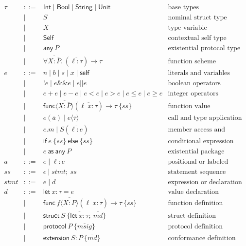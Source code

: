 \documentclass[manuscript,nonacm]{acmart}
\newcommand{\kw}[1]{\ensuremath{\mathsf{#1}}}
\newcommand{\Int}{\kw{Int}}
\newcommand{\Bool}{\kw{Bool}}
\newcommand{\String}{\kw{String}}
\newcommand{\Unit}{\kw{Unit}}
\newcommand{\Self}{\kw{Self}\xspace}
\newcommand{\Any}[1]{\kw{any}\ #1}
\newcommand{\ftype}[3]{\forall #1.\ (#2) \to #3}
\begin{document}
\[
\begin{array}{rcll}
\tau & ::= & \Int \mid \Bool \mid \String \mid \Unit
  & \text{base types} \\
& \mid & S
  & \text{nominal struct type} \\
& \mid & X
  & \text{type variable} \\
& \mid & \Self
  & \text{contextual self type} \\
& \mid & \Any{P}
  & \text{existential protocol type} \\
& \mid & \ftype{\overline{X : \overline{P}}}{\overline{\ell : \tau}}{\tau}
  & \text{function scheme} \\[1mm]

e & ::= & n \mid b \mid s \mid x \mid \kw{self}
  & \text{literals and variables} \\
& \mid & {!}e \mid e\mathbin{\&\&}e \mid e\mathbin{||}e
  & \text{boolean operators} \\
& \mid & e+e \mid e-e \mid e<e \mid e>e \mid e\leq e \mid e\geq e
  & \text{integer operators} \\
& \mid & \kw{func}\langle\overline{X : \overline{P}}\rangle
          (\overline{\ell\ x : \tau}) \to \tau\ \{ ss \}
  & \text{function value} \\
& \mid & e(\overline{a}) \mid e\langle\overline{\tau}\rangle
  & \text{call and type application} \\
& \mid & e.m \mid S(\overline{\ell : e})
  & \text{member access and construction} \\
& \mid & \kw{if}\ e\ \{ ss \}\ \kw{else}\ \{ ss \}
  & \text{conditional expression} \\
& \mid & e\ \kw{as}\ \Any{P}
  & \text{existential package} \\[1mm]

a & ::= & e \mid \ell : e
  & \text{positional or labeled argument} \\[1mm]

ss & ::= & \epsilon \mid stmt;\ ss
  & \text{statement sequence} \\
stmt & ::= & e \mid d
  & \text{expression or declaration} \\[1mm]

d & ::= & \kw{let}\ x : \tau = e
  & \text{value declaration} \\
& \mid & \kw{func}\ f\langle\overline{X : \overline{P}}\rangle
          (\overline{\ell\ x : \tau}) \to \tau\ \{ ss \}
  & \text{function definition} \\
& \mid & \kw{struct}\ S\ \{ \overline{\kw{let}\ x : \tau};\ \overline{md} \}
  & \text{struct definition} \\
& \mid & \kw{protocol}\ P\ \{ \overline{msig} \}
  & \text{protocol definition} \\
& \mid & \kw{extension}\ S : P\ \{ \overline{md} \}
  & \text{conformance definition}
\end{array}
\]
\end{document}
